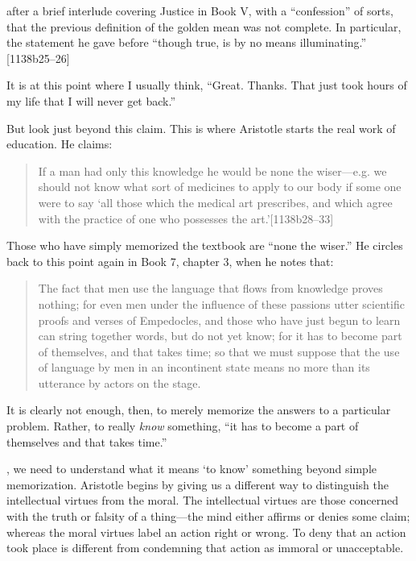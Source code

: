  after a brief interlude covering Justice in Book V, with a ``confession'' of sorts, that the previous definition of the golden mean was not complete. In particular, the statement he gave before ``though true, is by no means illuminating.'' [1138b25--26]

It is at this point where I usually think, ``Great. Thanks. That just took hours of my life that I will never get back.''

But look just beyond this claim. This is where Aristotle starts the real work of education. He claims:

\begin{quote}

If a man had only this knowledge he would be none the wiser---e.g. we should not know what sort of medicines to apply to our body if some one were to say `all those which the medical art prescribes, and which agree with the practice of one who possesses the art.'[1138b28--33]
\end{quote}

Those who have simply memorized the textbook are ``none the wiser.'' He circles back to this point again in Book 7, chapter 3, when he notes that: 

\begin{quote}

The fact that men use the language that flows from knowledge proves nothing; for even men under the influence of these passions utter scientific proofs and verses of Empedocles, and those who have just begun to learn can string together words, but do not yet know; for it has to become part of themselves, and that takes time; so that we must suppose that the use of language by men in an incontinent state means no more than its utterance by actors on the stage. ~\citep[1147a18--23]{Aristotle:1995uq}
\end{quote}

It is clearly not enough, then, to merely memorize the answers to a particular problem. Rather, to really \emph{know} something, ``it has to become a part of themselves and that takes time.'' ~\citep[1147a21--22]{Aristotle:1995uq}

, we need to understand what it means `to know' something beyond simple memorization. Aristotle begins by giving us a different way to distinguish the intellectual virtues from the moral. The intellectual virtues are those concerned with the truth or falsity of a thing---the mind either affirms or denies some claim; whereas the moral virtues label an action right or wrong. To deny that an action took place is different from condemning that action as immoral or unacceptable.

